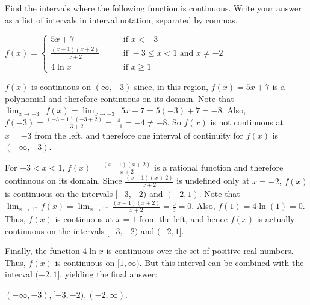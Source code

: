 \documentclass[handout,nooutcomes]{ximera}
\begin{document}
\begin{problem}
Find the intervals where the following function is continuous.  Write your answer as a list of intervals in interval notation, separated by commas.
	
	$f(x) =   \left\{ \begin{array}{cl}
	5x + 7		 	&	\qquad \text{if } x < -3					\\
	\frac{(x-1)(x+2)}{x+2}	&	\qquad \text{if } -3 \leq x < 1 \text{ and } x \neq -2	\\
	4 \ln x				&	\qquad \text{if } x \geq 1					\end{array} \right.  $
	
	\begin{freeResponse}
	
	$f(x)$ is continuous on $(\infty, -3)$ since, in this region, $f(x)=5x+7$ is a polynomial and therefore continuous on its domain.  Note that $\lim_{x \to -3^-} f(x) = \lim_{x \to -3^-} 5x+7 = 5(-3) + 7 = -8$.  Also, $f(-3) = \frac{(-3-1)(-3+2)}{-3+2} = \frac{4}{-1} = -4 \neq -8$.  So $f(x)$ is not continuous at $x=-3$ from the left, and therefore one interval of continuity for $f(x)$ is $(-\infty, -3)$.  
	
	For $-3 < x < 1$, $f(x) = \frac{(x-1)(x+2)}{x+2}$ is a rational function and therefore continuous on its domain.  Since $\frac{(x-1)(x+2)}{x+2}$ is undefined only at $x=-2$, $f(x)$ is continuous on the intervals $[-3,-2)$ and $(-2, 1)$.  Note that $\lim_{x \to 1^-} f(x) = \lim_{x \to 1^-} \frac{(x-1)(x+2)}{x+2} = \frac{0}{3} = 0$.  Also, $f(1) = 4 \ln (1) = 0$.  Thus, $f(x)$ is continuous at $x=1$ from the left, and hence $f(x)$ is actually continuous on the intervals $[-3,-2)$ and $(-2, 1]$.
	
	Finally, the function $4 \ln x$ is continuous over the set of positive real numbers.  Thus, $f(x)$ is continuous on $[1, \infty)$.  But this interval can be combined with the interval $(-2, 1]$, yielding the final answer:
	
	\begin{center}
	$(-\infty, -3), [-3, -2), (-2, \infty)$.
	\end{center}
	
	\end{freeResponse}
	
	
			
	
\end{problem}
	
	
	
	
			
			
\end{document}
